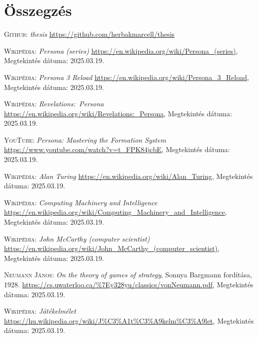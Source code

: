 \documentclass[
]{thesis-ekf}
\theoremstyle{definition}
\theoremstyle{remark}
\begin{document}

\chapter*{Összegzés}


\begin{thebibliography}{2}

\textsc{Github:} \emph{thesis} 
\url{https://github.com/herbakmarcell/thesis}

\textsc{Wikipédia:} \emph{Persona (series)} 
\url{https://en.wikipedia.org/wiki/Persona_(series)}, Megtekintés dátuma: 2025.03.19.

\textsc{Wikipédia:} \emph{Persona 3 Reload} 
\url{https://en.wikipedia.org/wiki/Persona_3_Reload}, Megtekintés dátuma: 2025.03.19.

\textsc{Wikipédia:} \emph{Revelations:~Persona} 
\url{https://en.wikipedia.org/wiki/Revelations:_Persona}, Megtekintés dátuma: 2025.03.19.

\textsc{YouTube:} \emph{Persona: Mastering the Formation System} 
\url{https://www.youtube.com/watch?v=t_FPK84jcbE}, Megtekintés dátuma: 2025.03.19.

\textsc{Wikipédia:} \emph{Alan Turing} 
\url{https://en.wikipedia.org/wiki/Alan_Turing}, Megtekintés dátuma: 2025.03.19.

\textsc{Wikipédia:} \emph{Computing Machinery and Intelligence} 
\url{https://en.wikipedia.org/wiki/Computing_Machinery_and_Intelligence}, Megtekintés dátuma: 2025.03.19.

\textsc{Wikipédia:} \emph{John McCarthy (computer scientist)} 
\url{https://en.wikipedia.org/wiki/John_McCarthy_(computer_scientist)}, Megtekintés dátuma: 2025.03.19.

\textsc{Neumann János}: \emph{On the theory of games of strategy}, Sonnya Bargmann fordítása, 1928.
\url{https://cs.uwaterloo.ca/%7Ey328yu/classics/vonNeumann.pdf}, Megtekintés dátuma: 2025.03.19.

\textsc{Wikipédia:} \emph{Játékelmélet} 
\url{https://hu.wikipedia.org/wiki/J%C3%A1t%C3%A9kelm%C3%A9let}, Megtekintés dátuma: 2025.03.19.


\end{thebibliography}
\end{document}
